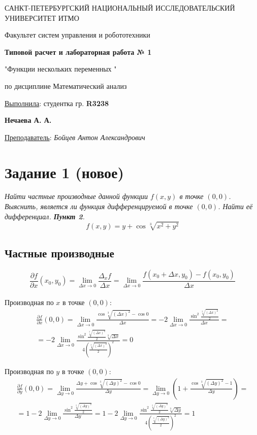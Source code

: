 \documentclass[a5paper, 10pt]{article}
\theoremstyle{definition}
\theoremstyle{plain}
\theoremstyle{remark}
\newcommand*{\titlePage}{
	\thispagestyle{title}
	\begingroup
	\begin{center}
		\vspace*{6ex}
		
		{\small
			САНКТ-ПЕТЕРБУРГСКИЙ НАЦИОНАЛЬНЫЙ ИССЛЕДОВАТЕЛЬСКИЙ УНИВЕРСИТЕТ ИТМО	
		}
		
		\vspace*{2ex}
		
		{\normalsize
			Факультет систем управления и робототехники
		}
		
		\vspace*{15ex}
		
		{\Large \bfseries 
			Типовой расчет и лабораторная работа № 1
		}
\vspace*{2ex}
	{\Large \bfseries 
			
"Функции нескольких переменных "
		}
\vspace*{2ex}
		
		{\normalsize
			по дисциплине Математический анализ
		}

	\end{center}
	\vspace*{20ex}
	\begin{flushright}
		{\large 
			\underline{Выполнила}: студентка гр. \textbf{R3238}\\
			\begin{flushright}
				\textbf{Нечаева А. А.}\\
			\end{flushright}
		}
		
		\vspace*{5ex}
		
		{\large 
			\underline{Преподаватель}: \textit{Бойцев Антон Александрович}
		}
	\end{flushright}	
	\newpage
	\setcounter{page}{1}
	\endgroup}
\begin{document}
	\titlePage
	\pagestyle{style}
\newpage



\section{Задание 1 (новое)}
\textit{Найти частные производные данной функции $f(x, y)$ в точке $(0, 0)$. Выяснить, является ли функция дифференцируемой в точке $(0, 0)$. Найти её дифференциал. \textbf{Пункт 2}.}
\begin{equation}
f(x, y) = y + \cos \sqrt[3]{x^2 + y^2}
\end{equation}
\subsection{Частные производные}

\begin{equation}
\frac{\partial f}{\partial x} (x_0, y_0) = \lim_{\Delta x \to 0} \frac{\Delta_x f}{\Delta x} = \lim_{\Delta x \to 0} \frac{f ( x_0 + \Delta x, y_0) - f(x_0, y_0)}{\Delta x}
\end{equation}
\\

Производная по $x$ в точке $(0, 0)$:
\begin{multline}
\frac{\partial f}{\partial x} (0, 0) = \lim_{\Delta x \to 0} \frac{\cos \sqrt[3]{( \Delta x)^2} - \cos 0}{\Delta x} = 
-2 \lim_{\Delta x \to 0} \frac{\sin^2  \frac{ \sqrt[3]{( \Delta x)^2}}{2}}{\Delta x} =\\
= -2 \lim_{\Delta x \to 0} \frac{\sin^2  \frac{ \sqrt[3]{( \Delta x)^2}}{2} \sqrt[3]{ \Delta x}}{4 \left(\frac{ \sqrt[3]{( \Delta x)^2}}{2} \right)^2} = 0
\end{multline}


Производная по $y$ в точке $(0, 0)$:
\begin{multline}
\frac{\partial f}{\partial y} (0, 0) = \lim_{\Delta y \to 0} \frac{\Delta y + \cos \sqrt[3]{( \Delta y)^2} - \cos 0}{\Delta y} = 
\lim_{\Delta y \to 0} \left(1 +  \frac{\cos \sqrt[3]{( \Delta y)^2} - 1}{\Delta y} \right) =\\
= 1 - 2 \lim_{\Delta y \to 0} \frac{\sin^2  \frac{ \sqrt[3]{( \Delta y)^2}}{2}}{\Delta y} 
=1 -2 \lim_{\Delta y \to 0} \frac{\sin^2  \frac{ \sqrt[3]{( \Delta y)^2}}{2} \sqrt[3]{ \Delta y}}{4 \left(\frac{ \sqrt[3]{( \Delta y)^2}}{2} \right)^2} = 1
\end{multline}
\end{document}
